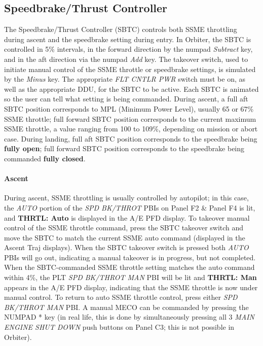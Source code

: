 \documentclass[Space_Shuttle_Vessel_Manual.tex]{subfiles}
\begin{document}
\begin{multicols*}{2}
\subsection{Speedbrake/Thrust Controller}
The Speedbrake/Thrust Controller (SBTC) controls both SSME throttling during ascent and the speedbrake setting during entry. In Orbiter, the SBTC is controlled in 5\% intervals, in the forward direction by the numpad \textit{Subtract} key, and in the aft direction via the numpad \textit{Add} key. The takeover switch, used to initiate manual control of the SSME throttle or speedbrake settings, is simulated by the \textit{Minus} key. The appropriate \textit{FLT CNTLR PWR} switch must be on, as well as the appropriate DDU, for the SBTC to be active. Each SBTC is animated so the user can tell what setting is being commanded. During ascent, a full aft SBTC position corresponds to MPL (Minimum Power Level), usually 65 or 67\% SSME throttle; full forward SBTC position corresponds to the current maximum SSME throttle, a value ranging from 100 to 109\%, depending on mission or abort case. During landing, full aft SBTC position corresponds to the speedbrake being \textbf{fully open}; full forward SBTC position corresponds to the speedbrake being commanded \textbf{fully closed}.

\paragraph{Ascent}
During ascent, SSME throttling is usually controlled by autopilot; in this case, the \textit{AUTO} portion of the \textit{SPD BK/THROT} PBIs on Panel F2 \& Panel F4 is lit, and \textbf{THRTL: Auto} is displayed in the A/E PFD display. To takeover manual control of the SSME throttle command, press the SBTC takeover switch and move the SBTC to match the current SSME auto command (displayed in the Ascent Traj displays). When the SBTC takeover switch is pressed both \textit{AUTO} PBIs will go out, indicating a manual takeover is in progress, but not completed. When the SBTC-commanded SSME throttle setting matches the auto command within 4\%, the PLT \textit{SPD BK/THROT MAN} PBI will be lit and \textbf{THRTL: Man} appears in the A/E PFD display, indicating that the SSME throttle is now under manual control. To return to auto SSME throttle control, press either \textit{SPD BK/THROT MAN} PBI. A manual MECO can be commanded by pressing the NUMPAD * key (in real life, this is done by simultaneously pressing all 3 \textit{MAIN ENGINE SHUT DOWN} push buttons on Panel C3; this is not possible in Orbiter).


\end{multicols*}
\end{document}
